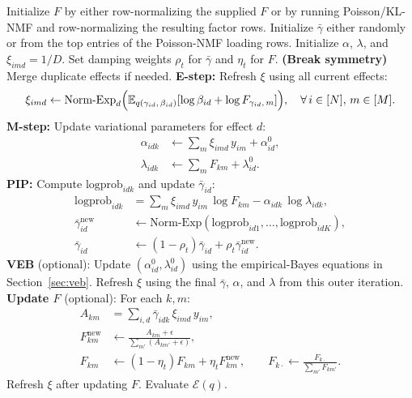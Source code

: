 \documentclass[11pt]{article}
\newcommand{\E}{\mathbb{E}}
\newcommand{\gb}{\bar{\gamma}}
\theoremstyle{definition}
\begin{document}
\begin{algorithm}[H]
\caption{MF-Poisson-SuSiE with learned $F$}
\small
\begin{algorithmic}[1]
\State Initialize $F$ by either row-normalizing the supplied $F$ or by running
  Poisson/KL-NMF and row-normalizing the resulting factor rows.
\State Initialize $\gb$ either randomly or from the top entries of the
  Poisson-NMF loading rows.
\State Initialize $\alpha$, $\lambda$, and $\xi_{imd} = 1/D$.
  \State Set damping weights $\rho_t$ for $\gb$ and $\eta_t$ for $F$.
  \State \textbf{(Break symmetry)} Merge duplicate effects if needed.
    \State \textbf{E-step:} Refresh $\xi$ using all current effects:
    \[
      \xi_{imd} \leftarrow \text{Norm-Exp}_{d}\Bigl(
        \E_{q(\gamma_{id},\, \beta_{id})}
        [\log \beta_{id} + \log F_{\gamma_{id},\, m}]
      \Bigr), \quad \forall\, i \in [N],\, m \in [M].
    \]
    \State \textbf{M-step:} Update variational parameters for effect $d$:
    \begin{align*}
      \alpha_{idk} &\leftarrow \sum_m \xi_{imd}\, y_{im} + \alpha_{id}^0, \\
      \lambda_{idk} &\leftarrow \sum_m F_{km} + \lambda_{id}^0.
    \end{align*}
    \State \textbf{PIP:} Compute $\text{logprob}_{idk}$ and update $\gb_{id}$:
    \begin{align*}
      \text{logprob}_{idk} &= \sum_m \xi_{imd}\, y_{im}\, \log F_{km} - \alpha_{idk}\, \log \lambda_{idk}, \\
      \gb_{id}^{\mathrm{new}} &\leftarrow \text{Norm-Exp}(\text{logprob}_{id1}, \ldots, \text{logprob}_{idK}), \\
      \gb_{id} &\leftarrow (1-\rho_t)\gb_{id} + \rho_t \gb_{id}^{\mathrm{new}}.
    \end{align*}
    \State \textbf{VEB} (optional): Update
      $(\alpha_{id}^0,\lambda_{id}^0)$ using the empirical-Bayes equations in
      Section~\ref{sec:veb}.
  \EndFor
  \State Refresh $\xi$ using the final $\gb$, $\alpha$, and $\lambda$ from this
  outer iteration.
  \State \textbf{Update $F$} (optional): For each $k, m$:
  \begin{align*}
    A_{km} &= \sum_{i,d} \gb_{idk}\, \xi_{imd}\, y_{im}, \\
    F^{\mathrm{new}}_{km} &\leftarrow
      \frac{A_{km} + \epsilon}{\sum_{m'} (A_{km'} + \epsilon)}, \\
    F_{km} &\leftarrow (1-\eta_t)F_{km} + \eta_t F^{\mathrm{new}}_{km},
    \qquad
    F_{k\cdot} \leftarrow \frac{F_{k\cdot}}{\sum_{m'}F_{km'}}.
  \end{align*}
  \State Refresh $\xi$ after updating $F$.
    \State Evaluate $\mathcal{E}(q)$.
  \EndIf
\EndFor
\end{algorithmic}
\end{algorithm}
\end{document}
